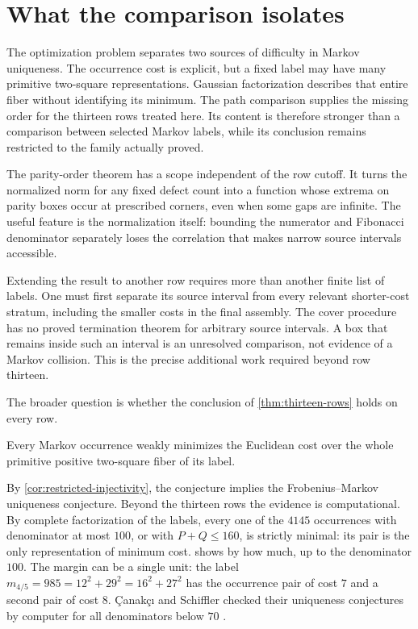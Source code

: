 \section{What the comparison isolates}\label{sec:outlook}

The optimization problem separates two sources of difficulty in
Markov uniqueness. The occurrence cost is explicit, but a fixed label
may have many primitive two-square representations. Gaussian
factorization describes that entire fiber without identifying its
minimum. The path comparison supplies the missing order for the thirteen
rows treated here. Its content is therefore stronger than a comparison
between selected Markov labels, while its conclusion remains restricted
to the family actually proved.

The parity-order theorem has a scope independent of the row cutoff. It
turns the normalized norm for any fixed defect count into a function
whose extrema on parity boxes occur at prescribed corners, even when
some gaps are infinite. The useful feature is the normalization itself:
bounding the numerator and Fibonacci denominator separately loses the
correlation that makes narrow source intervals accessible.

Extending the result to another row requires more than another finite
list of labels. One must first separate its source interval from every
relevant shorter-cost stratum, including the smaller costs in the final
assembly. The cover procedure has no proved termination theorem for
arbitrary source intervals. A box that remains inside such an interval
is an unresolved comparison, not evidence of a Markov collision.
This is the precise additional work required beyond row thirteen.

The broader question is whether the conclusion of
\cref{thm:thirteen-rows} holds on every row.

\begin{conjecture}
\label{conj:euclidean-minimality}
Every Markov occurrence weakly minimizes the Euclidean cost over the whole
primitive positive two-square fiber of its label.
\end{conjecture}

By \cref{cor:restricted-injectivity}, the conjecture implies the
Frobenius--Markov uniqueness conjecture. Beyond the thirteen rows the
evidence is computational. By complete factorization of the labels, every
one of the $4145$ occurrences with denominator at most $100$, or with
$P+Q\leqslant160$, is strictly minimal: its pair is the only representation of
minimum cost.  shows by how much, up to the denominator
$100$. The margin can be a single unit: the label
$m_{4/5}=985=12^2+29^2=16^2+27^2$ has the occurrence pair of cost $7$ and a
second pair of cost $8$. \c{C}anak\c{c}{\i} and Schiffler checked their
uniqueness conjectures by computer for all denominators below $70$
\cite[Remark~4.7]{CanakciSchiffler2020}.

